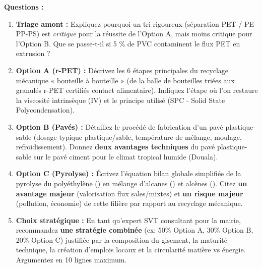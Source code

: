 \documentclass[11pt]{article}
\begin{document}
\begin{exercice}
\textbf{Questions :}
\begin{enumerate}
    \item \textbf{Triage amont :} Expliquez pourquoi un tri rigoureux (séparation PET / PE-PP-PS) est \emph{critique} pour la réussite de l'Option A, mais moins critique pour l'Option B. Que se passe-t-il si 5 \% de PVC contaminent le flux PET en extrusion ?
    \item \textbf{Option A (r-PET) :} Décrivez les 6 étapes principales du recyclage mécanique « bouteille à bouteille » (de la balle de bouteilles triées aux granulés r-PET certifiés contact alimentaire). Indiquez l'étape où l'on restaure la viscosité intrinsèque (IV) et le principe utilisé (SPC - Solid State Polycondensation).
    \item \textbf{Option B (Pavés) :} Détaillez le procédé de fabrication d'un pavé plastique-sable (dosage typique plastique/sable, température de mélange, moulage, refroidissement). Donnez \textbf{deux avantages techniques} du pavé plastique-sable sur le pavé ciment pour le climat tropical humide (Douala).
    \item \textbf{Option C (Pyrolyse) :} Écrivez l'équation bilan globale simplifiée de la pyrolyse du polyéthylène () en mélange d'alcanes () et alcènes (). Citez \textbf{un avantage majeur} (valorisation flux sales/mixtes) et \textbf{un risque majeur} (pollution, économie) de cette filière par rapport au recyclage mécanique.
    \item \textbf{Choix stratégique :} En tant qu'expert SVT consultant pour la mairie, recommandez \textbf{une stratégie combinée} (ex: 50\% Option A, 30\% Option B, 20\% Option C) justifiée par la composition du gisement, la maturité technique, la création d'emplois locaux et la circularité matière vs énergie. Argumentez en 10 lignes maximum.
\end{enumerate}
\end{exercice}
\end{document}

